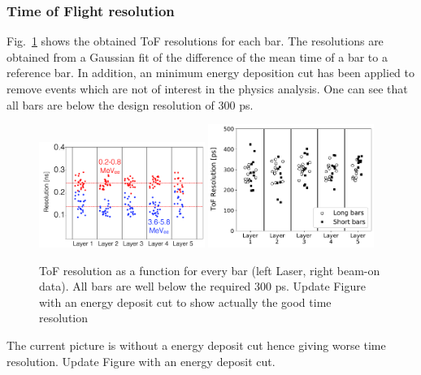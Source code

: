 \documentclass[3p,final,twocolumn]{elsarticle}
\begin{document}
{\subsubsection{Time of Flight resolution}
Fig.~\ref{fig:tof_resolution} shows the obtained ToF resolutions for each bar. The resolutions are obtained from a Gaussian fit of the difference of the mean time of a bar to a reference bar.
In addition, an minimum energy deposition cut has been applied to remove events which are not of interest in the physics analysis. One can see that all bars are below the design resolution of
300 \si{\pico\s}. 
\begin{figure}[h!]
	\centering
			\includegraphics[width=0.48\textwidth]{tof-resolutions-laser.png}
		\includegraphics[width=0.48\textwidth]{tof-resolutions-photons-2MeV.pdf}
	\caption{ToF resolution as a function for every bar (left Laser, right beam-on data). All bars are well below the required 300 \si{\pico\s}. {\color{red} Update Figure with an energy deposit cut to show actually the good time resolution}}
	\label{fig:tof_resolution}
\end{figure}

{\color{red} The current picture is without a energy deposit cut hence giving worse time resolution. Update Figure with an energy deposit cut.}

}
\end{document}
